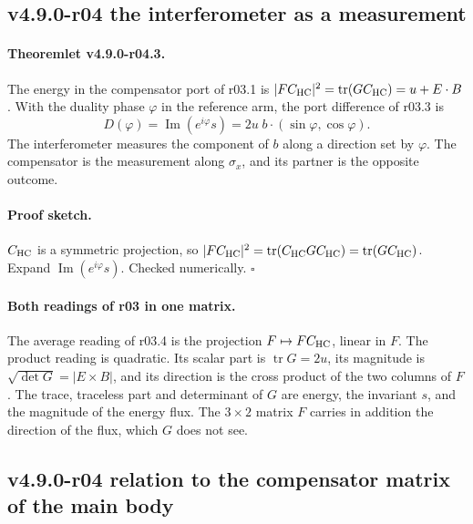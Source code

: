 \subsection*{v4.9.0-r04 the interferometer as a measurement}
\label{subsec:v490-r04-measurement}

\paragraph{Theoremlet v4.9.0-r04.3.}
The energy in the compensator port of r03.1 is \(|FC_{\mathrm{HC}}|^2=\operatorname{tr}(GC_{\mathrm{HC}})=u+E\cdot B\).  With the duality phase
\(\varphi\) in the reference arm, the port difference of r03.3 is
\[
D(\varphi)=\operatorname{Im}(e^{i\varphi}s)=2u\;b\cdot(\sin\varphi,\cos\varphi).
\]
The interferometer measures the component of \(b\) along a direction set by \(\varphi\).  The compensator is the
measurement along \(\sigma_x\), and its partner is the opposite outcome.

\paragraph{Proof sketch.}
\(C_{\mathrm{HC}}\) is a symmetric projection, so \(|FC_{\mathrm{HC}}|^2=\operatorname{tr}(C_{\mathrm{HC}}GC_{\mathrm{HC}})=\operatorname{tr}(GC_{\mathrm{HC}})\).
Expand \(\operatorname{Im}(e^{i\varphi}s)\).  Checked numerically.  \(\square\)

\paragraph{Both readings of r03 in one matrix.}
The average reading of r03.4 is the projection \(F\mapsto FC_{\mathrm{HC}}\), linear in \(F\).  The product reading is
quadratic.  Its scalar part is \(\operatorname{tr}G=2u\), its magnitude is \(\sqrt{\det G}=|E\times B|\), and its direction is
the cross product of the two columns of \(F\).  The trace, traceless part and determinant of \(G\) are energy, the
invariant \(s\), and the magnitude of the energy flux.  The \(3\times2\) matrix \(F\) carries in addition the direction of
the flux, which \(G\) does not see.

\subsection*{v4.9.0-r04 relation to the compensator matrix of the main body}
\label{subsec:v490-r04-hc-matrix}

